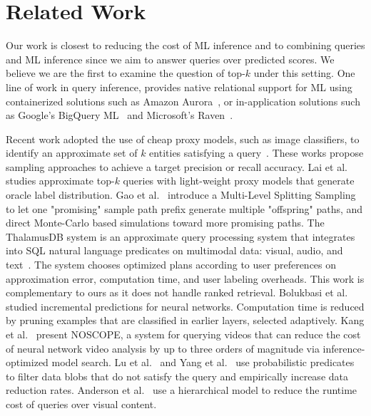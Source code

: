 \section{Related Work}\label{sec:rel}
Our work is closest to reducing the cost of ML inference and to combining queries and ML inference since we aim to answer queries over predicted scores. We believe we are the first to examine the question of top-$k$ under this setting. 
One line of work in query inference, provides native relational support for ML  using containerized solutions such as Amazon Aurora~\cite{sagemaker_2022}, or in-application solutions such as Google's BigQuery ML~\cite{bigquery_2022} and Microsoft's Raven~\cite{DBLP:conf/cidr/KaranasosIPSPPX20}. 

Recent work adopted the use of cheap proxy models, such as image classifiers, to identify  an  approximate  set of $k$ entities satisfying a query~\cite{DBLP:journals/pvldb/DingAL22,DBLP:journals/pvldb/KangGBHZ20}. These works propose sampling approaches to achieve a target precision or recall accuracy. 
Lai et al.~\cite{10.1145/3448016.3452786} studies approximate top-$k$ queries with light-weight proxy models that generate oracle label distribution.
Gao et al.~\cite{DBLP:conf/sigmod/GaoXAY21} introduce a Multi-Level Splitting Sampling to let one "promising" sample path prefix generate multiple "offspring" paths, and direct Monte-Carlo based simulations toward more promising paths.  The ThalamusDB system is an approximate query processing system that integrates into SQL natural language predicates on multimodal data: visual, audio, and text~\cite{DBLP:journals/pacmmod/JoT24}. The system chooses optimized plans according to user preferences on approximation error, computation time, and user labeling overheads. This work is complementary to ours as it does not handle ranked retrieval.
Bolukbasi et al.~\cite{DBLP:conf/icml/BolukbasiWDS17} studied incremental predictions for neural networks.  
 Computation time is reduced by pruning examples that are classified in earlier layers, selected adaptively. 
Kang et al.~\cite{DBLP:journals/pvldb/KangEABZ17} present NOSCOPE, a system for querying videos that can reduce the cost of neural network video analysis by up to three orders of magnitude via inference-optimized model search.
Lu et al.~\cite{DBLP:conf/sigmod/LuCKC18} and Yang et al.~\cite{10.14778/3547305.3547310} use probabilistic predicates to filter data blobs that do not satisfy the query and empirically increase data reduction rates. 
Anderson et al.~\cite{DBLP:conf/icde/AndersonCRW19} use a hierarchical model to reduce the runtime cost of queries over visual content. 